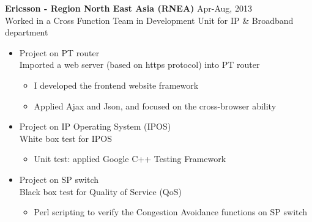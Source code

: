 \documentclass[line,margin]{res}
\begin{document}
\begin{resume}
{\bf Ericsson - Region North East Asia (RNEA)}
\hfill{\textcolor[rgb]{0.7,0.7,0.7}{Apr-Aug, 2013}}\\
Worked in a Cross Function Team in Development Unit for IP \& Broadband department

\begin{itemize}
\itemsep -2pt %

    \item Project on PT router\\
    Imported a web server (based on https protocol) into PT router\vspace{-6pt}
    \begin{itemize} \itemsep -2pt
        \item I developed the frontend website framework
        \item Applied Ajax and Json, and focused on the cross-browser ability
    \end{itemize}
    
    \item Project on IP Operating System (IPOS)\\
    White box test for IPOS\vspace{-6pt}
    \begin{itemize}\itemsep -2pt %
        \item Unit test: applied Google C++ Testing Framework
    \end{itemize}
    
    \item Project on SP switch\\
    Black box test for Quality of Service (QoS)\vspace{-6pt}
    \begin{itemize}\itemsep -2pt %
        \item Perl scripting to verify the Congestion Avoidance functions on SP switch
    \end{itemize}

\end{itemize}


\end{resume}
\end{document}
